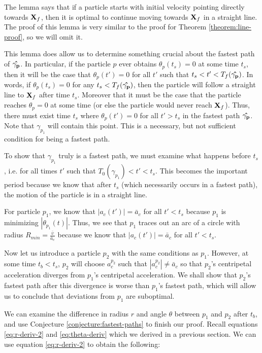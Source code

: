 The lemma says that if a particle starts with initial velocity pointing directly towards $\mathbf{X}_f$, then it is optimal to continue moving towards $\mathbf{X}_f$ in a straight line. The proof of this lemma is very similar to the proof for Theorem \ref{theorem:line-proof}, so we will omit it.

This lemma does allow us to determine something crucial about the fastest path of $\mathbf{\hat{\gamma_{p}}}$. In particular, if the particle $p$ ever obtains $\theta_p(t_s) = 0$ at some time $t_s$, then it will be the case that $\theta_p(t') = 0$ for all $t'$ such that $t_s < t' < T_f(\mathbf{\hat{\gamma_p}})$. In words, if $\theta_p(t_s) = 0$ for any $t_s < T_f(\mathbf{\hat{\gamma_p}})$, then the particle will follow a straight line to $\mathbf{X}_f$ after time $t_s$. Moreover that it must be the case that the particle reaches $\theta_p = 0$ at some time (or else the particle would never reach $\mathbf{X}_f$). Thus, there must exist time $t_s$ where $\theta_p(t') = 0$ for all $t' > t_s$ in the fastest path $\mathbf{\hat{\gamma_p}}$. Note that $\gamma_{p_1}$ will contain this point. This is a necessary, but not sufficient condition for being a fastest path.

To show that $\gamma_{p_1}$ truly is a fastest path, we must examine what happens before $t_s$, i.e. for all times $t'$ such that $T_0(\gamma_{p_1}) < t' < t_s$. This becomes the important period because we know that after $t_s$ (which necessarily occurs in a fastest path), the motion of the particle is in a straight line.

For particle $p_1$, we know that $|a_c(t')| = \bar{a}_c$ for all $t' < t_s$ because $p_1$ is minimizing $|\theta_{p_1}(t)|$. Thus, we see that $p_1$ traces out an arc of a circle with radius $R_{min} = \frac{\bar{v}}{\bar{a}_c}$ because we know that $|a_c(t')| = \bar{a}_c$ for all $t' < t_s$.

Now let us introduce a particle $p_2$ with the same conditions as $p_1$. However, at some time $t_b < t_s$, $p_2$ will choose $a^{p_2}_c$ such that $|a^{p_2}_c| \neq \bar{a}_c$ so that $p_2$'s centripetal acceleration diverges from $p_1$'s centripetal acceleration. We shall show that $p_2$'s fastest path after this divergence is worse than $p_1$'s fastest path, which will allow us to conclude that deviations from $p_1$ are suboptimal.

We can examine the difference in radius $r$ and angle $\theta$ between $p_1$ and $p_2$ after $t_b$, and use Conjecture \ref{conjecture:fastest-paths} to finish our proof. Recall equations \ref{eq:r-deriv-2} and \ref{eq:theta-deriv} which we derived in a previous section. We can use equation \ref{eq:r-deriv-2} to obtain the following:

